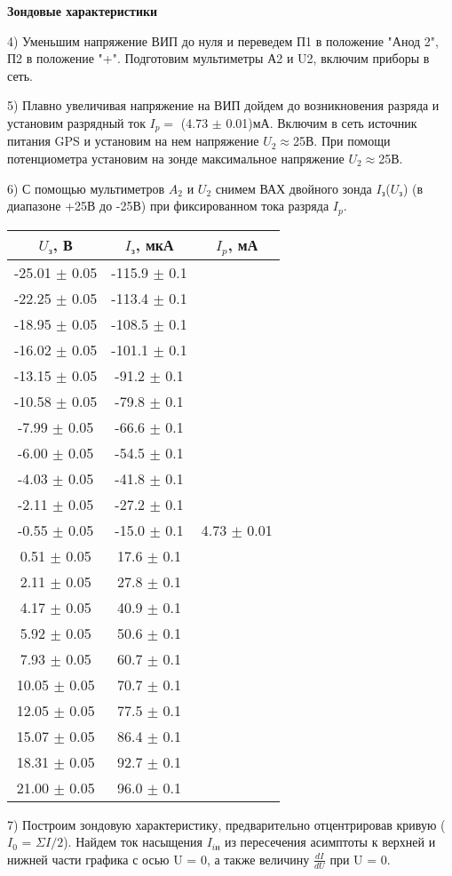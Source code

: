 \documentclass[a4paper,12pt]{article}
\begin{document}
\par \textbf{Зондовые характеристики}

\par 4) Уменьшим напряжение ВИП до нуля и переведем П1 в положение "Анод 2", П2 в положение "+". Подготовим мультиметры А2 и U2, включим приборы в сеть. 

\par 5) Плавно увеличивая напряжение на ВИП дойдем до возникновения разряда и установим разрядный ток $I_p = $ (4.73 $\pm$ 0.01)мА. Включим в сеть источник питания GPS и установим на нем напряжение $U_2\approx$25В. При помощи потенциометра установим на зонде максимальное напряжение $U_2\approx$25В. 

\par 6) С помощью мультиметров $A_2$ и $U_2$ снимем ВАХ двойного зонда $I_{\text{з}}$($U_{\text{з}}$) (в диапазоне +25В до -25В) при фиксированном тока разряда $I_p$.

\begin{tabular}{|c|c|c|}
	\hline
	$U_{\text{з}}$, В & $I_{\text{з}}$, мкА &  $I_p$, мА \\
	\hline
	-25.01 $\pm$ 0.05 & -115.9 $\pm$ 0.1 & \multirow{21}{*}{4.73 $\pm$ 0.01}\\
	\cline{1-2} 
	-22.25 $\pm$ 0.05 & -113.4 $\pm$ 0.1 & \\
	\cline{1-2}
	-18.95 $\pm$ 0.05 & -108.5 $\pm$ 0.1 & \\
	\cline{1-2}
	-16.02 $\pm$ 0.05 & -101.1 $\pm$ 0.1 & \\
	\cline{1-2}
	-13.15 $\pm$ 0.05 & -91.2 $\pm$ 0.1 & \\
	\cline{1-2}
	-10.58 $\pm$ 0.05 & -79.8 $\pm$ 0.1 & \\
	\cline{1-2}
	-7.99 $\pm$ 0.05 & -66.6 $\pm$ 0.1 & \\
	\cline{1-2}
	-6.00 $\pm$ 0.05 & -54.5 $\pm$ 0.1 & \\
	\cline{1-2}
	-4.03 $\pm$ 0.05 & -41.8 $\pm$ 0.1 & \\
	\cline{1-2}
	-2.11 $\pm$ 0.05 & -27.2 $\pm$ 0.1 & \\
	\cline{1-2}
	-0.55 $\pm$ 0.05 & -15.0 $\pm$ 0.1 & \\
	\cline{1-2}
	0.51 $\pm$ 0.05 & 17.6 $\pm$ 0.1 & \\
	\cline{1-2}
	2.11 $\pm$ 0.05 & 27.8 $\pm$ 0.1 & \\
	\cline{1-2}
	4.17 $\pm$ 0.05 & 40.9 $\pm$ 0.1 & \\
	\cline{1-2}
	5.92 $\pm$ 0.05 & 50.6 $\pm$ 0.1 & \\
	\cline{1-2}
	7.93 $\pm$ 0.05 & 60.7 $\pm$ 0.1 & \\
	\cline{1-2}
	10.05 $\pm$ 0.05 & 70.7 $\pm$ 0.1 & \\
	\cline{1-2}
	12.05 $\pm$ 0.05 & 77.5 $\pm$ 0.1 & \\
	\cline{1-2}
	15.07 $\pm$ 0.05 & 86.4 $\pm$ 0.1 & \\
	\cline{1-2}
	18.31 $\pm$ 0.05 & 92.7 $\pm$ 0.1 & \\
	\cline{1-2}
	21.00 $\pm$ 0.05 & 96.0 $\pm$ 0.1 & \\
	\hline
\end{tabular}

\par 7) Построим зондовую характеристику, предварительно отцентрировав кривую    ($I_0$ = $\Sigma I/2$). Найдем ток насыщения $I_{i\text{н}}$ из пересечения асимптоты к верхней и нижней части графика с осью U = 0, а также величину $\frac{dI}{dU}$ при U = 0.
\end{document}

